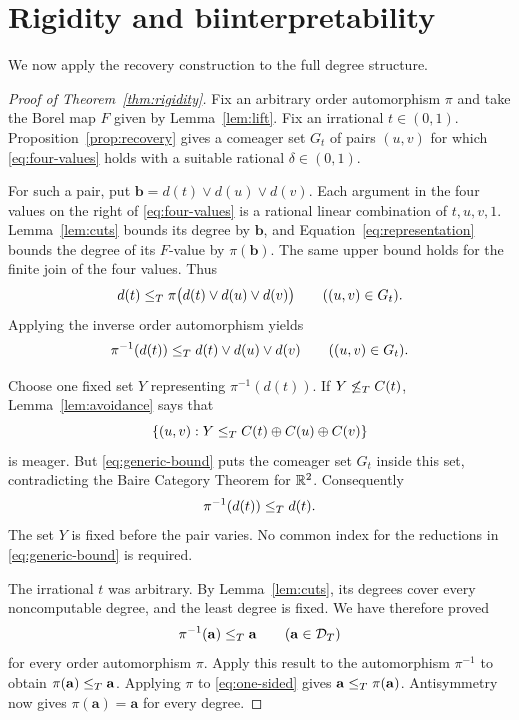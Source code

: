 \section{Rigidity and biinterpretability}
\label{sec:rigidity}

We now apply the recovery construction to the full degree
structure.

\begin{proof}[Proof of Theorem~\ref{thm:rigidity}]
Fix an arbitrary order automorphism $\pi$ and take the
Borel map $F$ given by Lemma~\ref{lem:lift}. Fix an
irrational $t\in(0,1)$. Proposition~\ref{prop:recovery}
gives a comeager set $G_t$ of pairs $(u,v)$ for which
\eqref{eq:four-values} holds with a suitable rational
$\delta\in(0,1)$.

For such a pair, put
$\mathbf b=d(t)\vee d(u)\vee d(v)$.
Each argument in the four values on the right of
\eqref{eq:four-values} is a rational linear combination
of $t,u,v,1$. Lemma~\ref{lem:cuts} bounds its degree by
$\mathbf b$, and Equation~\eqref{eq:representation}
bounds the degree of its $F$-value by $\pi(\mathbf b)$.
The same upper bound holds for the finite join of the
four values. Thus
\[
d(t)\le_T \pi\bigl(d(t)\vee d(u)\vee d(v)\bigr)
\qquad((u,v)\in G_t).
\]
Applying the inverse order automorphism yields
\begin{equation}\label{eq:generic-bound}
\pi^{-1}(d(t))\le_T d(t)\vee d(u)\vee d(v)
\qquad((u,v)\in G_t).
\end{equation}

Choose one fixed set $Y$ representing $\pi^{-1}(d(t))$.
If $Y\not\le_T C(t)$, Lemma~\ref{lem:avoidance} says that
\[
\{(u,v):Y\le_T C(t)\oplus C(u)\oplus C(v)\}
\]
is meager. But \eqref{eq:generic-bound} puts the
comeager set $G_t$ inside this set, contradicting the
Baire Category Theorem for $\mathbb R^2$. Consequently
\[
\pi^{-1}(d(t))\le_T d(t).
\]
The set $Y$ is fixed before the pair varies. No common
index for the reductions in \eqref{eq:generic-bound}
is required.

The irrational $t$ was arbitrary. By Lemma~\ref{lem:cuts},
its degrees cover every noncomputable degree, and the
least degree is fixed. We have therefore proved
\begin{equation}\label{eq:one-sided}
\pi^{-1}(\mathbf a)\le_T\mathbf a
\qquad(\mathbf a\in\mathcal D_T)
\end{equation}
for every order automorphism $\pi$.
Apply this result to the automorphism $\pi^{-1}$ to
obtain $\pi(\mathbf a)\le_T\mathbf a$. Applying $\pi$
to \eqref{eq:one-sided} gives
$\mathbf a\le_T\pi(\mathbf a)$. Antisymmetry now gives
$\pi(\mathbf a)=\mathbf a$ for every degree.
\end{proof}


